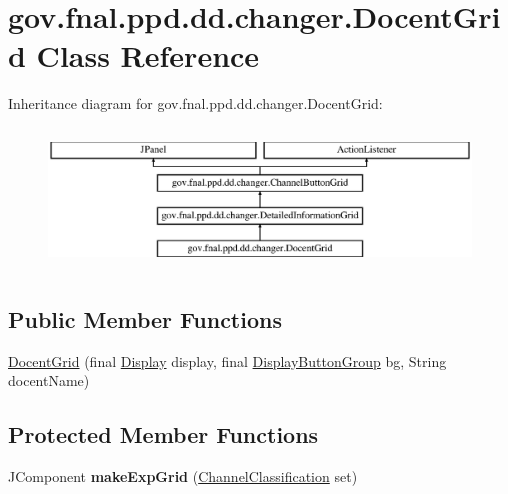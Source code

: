 \hypertarget{classgov_1_1fnal_1_1ppd_1_1dd_1_1changer_1_1DocentGrid}{\section{gov.\-fnal.\-ppd.\-dd.\-changer.\-Docent\-Grid Class Reference}
\label{classgov_1_1fnal_1_1ppd_1_1dd_1_1changer_1_1DocentGrid}
}
Inheritance diagram for gov.\-fnal.\-ppd.\-dd.\-changer.\-Docent\-Grid\-:\begin{figure}[H]
\begin{center}
\leavevmode
\includegraphics[height=3.783784cm]{classgov_1_1fnal_1_1ppd_1_1dd_1_1changer_1_1DocentGrid}
\end{center}
\end{figure}
\subsection*{Public Member Functions}
\begin{DoxyCompactItemize}
\item 
\hyperlink{classgov_1_1fnal_1_1ppd_1_1dd_1_1changer_1_1DocentGrid_a8d11fc4a2cae91c4b626b99ad1c8051a}{Docent\-Grid} (final \hyperlink{interfacegov_1_1fnal_1_1ppd_1_1dd_1_1signage_1_1Display}{Display} display, final \hyperlink{classgov_1_1fnal_1_1ppd_1_1dd_1_1util_1_1DisplayButtonGroup}{Display\-Button\-Group} bg, String docent\-Name)
\end{DoxyCompactItemize}
\subsection*{Protected Member Functions}
\begin{DoxyCompactItemize}
\item 
\hypertarget{classgov_1_1fnal_1_1ppd_1_1dd_1_1changer_1_1DocentGrid_a049a89e704008b6edc63cd15cc9b48f4}{J\-Component {\bfseries make\-Exp\-Grid} (\hyperlink{classgov_1_1fnal_1_1ppd_1_1dd_1_1changer_1_1ChannelClassification}{Channel\-Classification} set)}\label{classgov_1_1fnal_1_1ppd_1_1dd_1_1changer_1_1DocentGrid_a049a89e704008b6edc63cd15cc9b48f4}

\end{DoxyCompactItemize}
